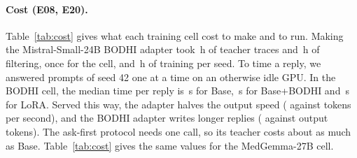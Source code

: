 \documentclass{article}
\newcommand{\bodhi}{BODHI}
\begin{document}
\paragraph{Cost (E08, E20).} Table~\ref{tab:cost} gives what each training cell cost to make
and to run. Making the Mistral-Small-24B \bodhi{} adapter took \statHBMistralTimeTracesH{}\,h of teacher traces and
\statHBMistralTimeFilterH{}\,h of filtering, once for the cell, and
\statHBMistralTimeTrainSeedH{}\,h of training per seed. To time a reply, we answered
\statHBMistralBenchPrompts{} prompts of seed 42 one at a time on an otherwise idle GPU. In the
\bodhi{} cell, the median time per reply is \statHBMistralBenchBaseMedianS\,s for Base,
\statHBMistralBenchBaseBodhiMedianS\,s for Base+\bodhi{} and \statHBMistralBenchLoRAMedianS\,s for
LoRA. Served this way, the adapter halves the output speed (\statHBMistralBenchLoRATokPerS{}
against \statHBMistralBenchBaseTokPerS{} tokens per second), and the \bodhi{} adapter writes longer
replies (\statHBMistralBenchLoRATokens{} against \statHBMistralBenchBaseTokens{} output tokens). The
ask-first protocol needs one call, so its teacher costs about as much as Base. Table~\ref{tab:cost}
gives the same values for the MedGemma-27B cell.

\begin{table}[!ht]
\centering
\caption{The cost of each training cell of \S\ref{sec:rerun}. Traces and filter: wall-clock hours,
once for the cell. Train: mean hours per seed. Base, Teacher and LoRA: median seconds per reply,
one reply at a time on an otherwise idle GPU, \statHBMistralBenchPrompts{} prompts of seed 42; the
teacher is Base with the cell's protocol. The Mistral-Small-24B traces and filter ran on an H100 of a
shared host; the rest of this table ran on A100s, one card per job.}
\label{tab:cost}
\small
\setlength{\tabcolsep}{3pt}
\resizebox{\linewidth}{!}{}
\end{table}
\end{document}
